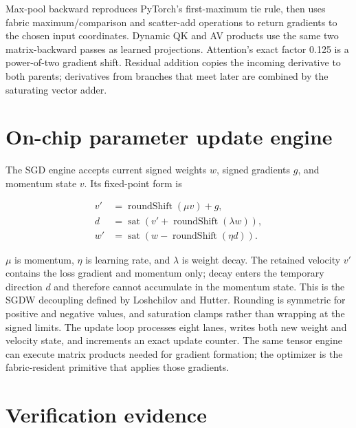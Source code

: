 \documentclass[10pt]{article}
\begin{document}
Max-pool backward reproduces PyTorch's first-maximum tie rule, then uses fabric
maximum/comparison and scatter-add operations to return gradients to the chosen
input coordinates. Dynamic QK and AV products use the same two matrix-backward
passes as learned projections. Attention's exact factor 0.125 is a power-of-two
gradient shift. Residual addition copies the incoming derivative to both
parents; derivatives from branches that meet later are combined by the
saturating vector adder.

\section{On-chip parameter update engine}

The SGD engine accepts current signed weights $w$, signed gradients $g$, and
momentum state $v$. Its fixed-point form is

\begin{align*}
  v' &= \operatorname{roundShift}(\mu v)+g,\\
  d  &= \operatorname{sat}\left(v'+\operatorname{roundShift}(\lambda w)\right),\\
  w' &= \operatorname{sat}\left(w-\operatorname{roundShift}(\eta d)\right).
\end{align*}

$\mu$ is momentum, $\eta$ is learning rate, and $\lambda$ is weight decay.
The retained velocity $v'$ contains the loss gradient and momentum only;
decay enters the temporary direction $d$ and therefore cannot accumulate in
the momentum state. This is the SGDW decoupling defined by Loshchilov and
Hutter. Rounding is symmetric for positive and negative values, and saturation
clamps rather than wrapping at the signed limits. The update loop processes
eight lanes, writes both new weight and velocity state, and increments an exact
update counter. The same tensor engine can execute matrix products needed for
gradient formation; the optimizer is the fabric-resident primitive that
applies those gradients.

\section{Verification evidence}
\end{document}
